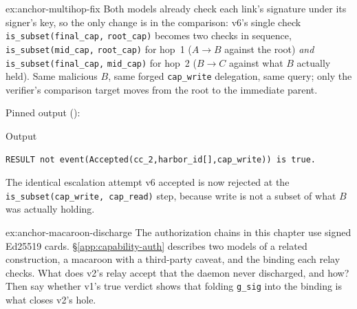 \documentclass[11pt,a4paper]{article}
\theoremstyle{definition}
\begin{document}
\begin{pdsolution}{ex:anchor-multihop-fix}
Both models already check each link's signature under its signer's key, so the only change is in the comparison: v6's single check \texttt{is\allowbreak\_subset(final\allowbreak\_cap,} \texttt{root\allowbreak\_cap)} becomes two checks in sequence, \texttt{is\allowbreak\_subset(mid\allowbreak\_cap,} \texttt{root\allowbreak\_cap)} for hop~1 ($A \to B$ against the root) \emph{and} \texttt{is\allowbreak\_subset(final\allowbreak\_cap,} \texttt{mid\allowbreak\_cap)} for hop~2 ($B \to C$ against what $B$ actually held). Same malicious $B$, same forged \texttt{cap\_write} delegation, same query; only the verifier's comparison target moves from the root to the immediate parent.

Pinned output ():
\begin{pdlisting}{Output}{}
\begin{lstlisting}[style=pdoutput]
RESULT not event(Accepted(cc_2,harbor_id[],cap_write)) is true.
\end{lstlisting}
\end{pdlisting}
The identical escalation attempt v6 accepted is now rejected at the \texttt{is\_subset(cap\_write, cap\_read)} step, because write is not a subset of what $B$ was actually holding.
\end{pdsolution}
%
\begin{pdexercise}[kind=Trace,rating=3]{ex:anchor-macaroon-discharge}
The authorization chains in this chapter use signed Ed25519 cards. \S\ref{app:capability-auth} describes two models of a related construction, a macaroon with a third-party caveat, and the binding each relay checks. What does v2's relay accept that the daemon never discharged, and how? Then say whether v1's true verdict shows that folding \texttt{g\_sig} into the binding is what closes v2's hole.
\end{pdexercise}
\end{document}
